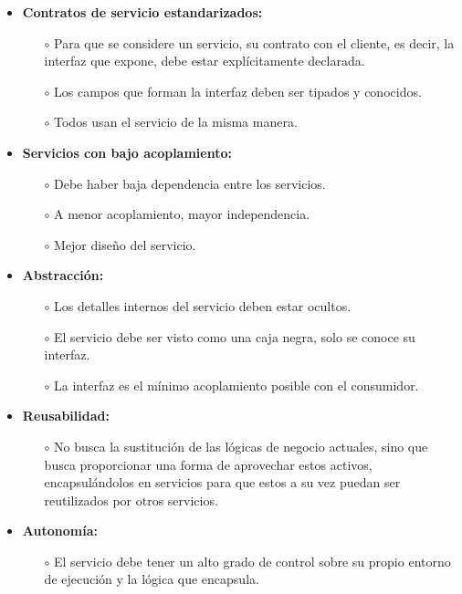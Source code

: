 \begin{itemize}
    \item \textbf{Contratos de servicio estandarizados:}
    \begin{itemize}
        \item[$\circ$] Para que se considere un servicio, su contrato con el cliente, es decir, la interfaz que expone, debe estar explícitamente declarada.
        \item[$\circ$] Los campos que forman la interfaz deben ser tipados y conocidos.
        \item[$\circ$] Todos usan el servicio de la misma manera.  
    \end{itemize}
    \item \textbf{Servicios con bajo acoplamiento:}
    \begin{itemize}
        \item[$\circ$] Debe haber baja dependencia entre los servicios.
        \item[$\circ$] A menor acoplamiento, mayor independencia.
        \item[$\circ$] Mejor diseño del servicio. 
    \end{itemize}
    \item \textbf{Abstracción:}
    \begin{itemize}
        \item[$\circ$] Los detalles internos del servicio deben estar ocultos.
        \item[$\circ$] El servicio debe ser visto como una caja negra, solo se conoce su interfaz.
        \item[$\circ$] La interfaz es el mínimo acoplamiento posible con el consumidor.
    \end{itemize}
    \item \textbf{Reusabilidad:}
    \begin{itemize}
        \item [$\circ$] No busca la sustitución de las lógicas de negocio actuales, sino que busca proporcionar una forma de aprovechar estos activos, encapsulándolos en servicios para que estos a su vez puedan ser reutilizados por otros servicios.
    \end{itemize}
    \item \textbf{Autonomía:}
    \begin{itemize}
        \item [$\circ$] El servicio debe tener un alto grado de control sobre su propio entorno de ejecución y la lógica que encapsula.
    \end{itemize}

\end{itemize}
